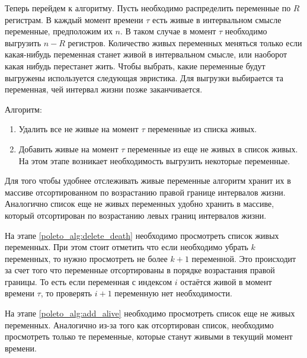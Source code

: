 Теперь перейдем к алгоритму. Пусть необходимо распределить переменные по $R$ регистрам. В каждый момент
времени $\tau$ есть живые в интервальном смысле переменные, предположим их $n$. В таком случае в момент $\tau$
необходимо выгрузить $n - R$ регистров. Количество живых переменных меняться только если какая-нибудь
переменная станет живой в интервальном смысле, или наоборот какая нибудь перестанет жить.
Чтобы выбрать, какие переменные будут выгружены используется следующая эвристика.
Для выгрузки выбирается та переменная, чей интервал жизни позже заканчивается.

Алгоритм:
\begin{enumerate}
    \item Удалить все не живые на момент $\tau$ переменные из списка живых. \label{poleto_alg:delete_death}
    \item Добавить живые на момент $\tau$ переменные из еще не живых в список живых. На этом этапе
    возникает необходимость выгрузить некоторые переменные. \label{poleto_alg:add_alive}
\end{enumerate}

Для того чтобы удобнее отслеживать живые переменные алгоритм хранит их в массиве отсортированном по
возрастанию правой границе интервалов жизни. Аналогично список еще не живых переменных удобно хранить в массиве,
который отсортирован по возрастанию левых границ интервалов жизни.

На этапе \ref{poleto_alg:delete_death} необходимо просмотреть список живых переменных. При этом стоит отметить
что если необходимо убрать $k$ переменных, то нужно просмотреть не более $k+1$ переменной. Это происходит за счет
того что переменные отсортированы в порядке возрастания правой границы. То есть если переменная с индексом $i$
остаётся живой в момент времени $\tau$, то проверять $i + 1$ переменную нет необходимости.

На этапе \ref{poleto_alg:add_alive} необходимо просмотреть список еще не живых переменных. Аналогично
из-за того как отсортирован список, необходимо просмотреть только те переменные, которые станут живыми
в текущий момент времени.

